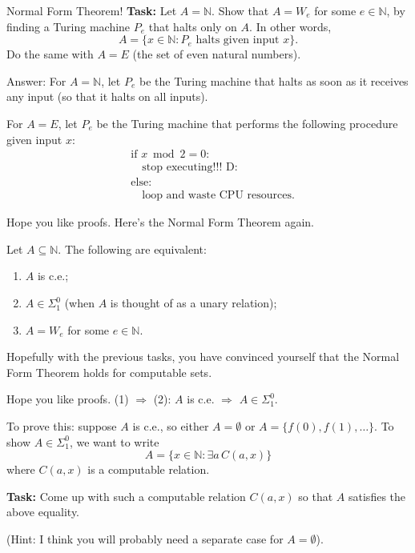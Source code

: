 \documentclass{beamer}
\begin{document}
\begin{frame}{Normal Form Theorem!}
\textbf{Task:} Let $A = \mathbb N$. Show that $A = W_e$ for some $e \in \mathbb N$, by finding a Turing machine $P_e$ that halts only on $A$. In other words,
$$A = \{x \in \mathbb N: \text{$P_e$ halts given input $x$}\}.$$
Do the same with $A = E$ (the set of even natural numbers).

\vspace{2mm}

\pause

Answer: For $A = \mathbb N$, let $P_e$ be the Turing machine that halts as soon as it receives any input (so that it halts on all inputs).

For $A = E$, let $P_e$ be the Turing machine that performs the following procedure given input $x$:
\begin{align*}
& \text{if $x \bmod 2 = 0$}:\\
& \quad \text{stop executing!!! D:}\\
& \text{else}:\\
& \quad \text{loop and waste CPU resources.}
\end{align*}
\end{frame}


\begin{frame}{Hope you like proofs.}
Here's the Normal Form Theorem again.
\begin{theorem}
Let $A \subseteq \mathbb N$. The following are equivalent:
\begin{enumerate}
\item $A$ is c.e.;
\item $A \in \Sigma^0_1$ (when $A$ is thought of as a unary relation);
\item $A = W_e$ for some $e \in \mathbb N$.
\end{enumerate}
\end{theorem}

Hopefully with the previous tasks, you have convinced yourself that the Normal Form Theorem holds for computable sets.

\vspace{2mm}
\end{frame}

\begin{frame}{Hope you like proofs.}
(1) $\Rightarrow$ (2): $A$ is c.e. $\Rightarrow$ $A \in \Sigma^0_1$.

\vspace{2mm}

To prove this: suppose $A$ is c.e., so either $A = \emptyset$ or $A = \{f(0), f(1), \ldots\}$. To show $A \in \Sigma^0_1$, we want to write
$$A = \{x \in \mathbb N: \exists a \, C(a, x)\}$$
where $C(a, x)$ is a computable relation.

\vspace{2mm}

\textbf{Task:} Come up with such a computable relation $C(a, x)$ so that $A$ satisfies the above equality. 

\vspace{2mm}

(Hint: I think you will probably need a separate case for $A = \emptyset$).
\end{frame}
\end{document}

